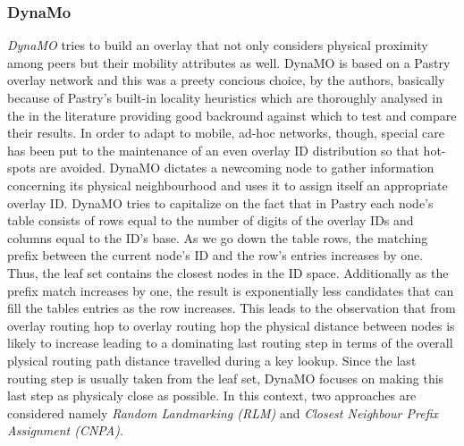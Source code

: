 %
%

\subsubsection{DynaMo}
\emph{DynaMO} \cite{winter_dynamo_2004} tries to build an overlay that not only 
considers physical proximity among peers but their mobility attributes as well.
DynaMO is based on a Pastry overlay network and this was a preety concious
choice, by the authors, basically because of Pastry's built-in locality
heuristics which are thoroughly analysed in the in the literature
\cite{castro_proximityp2p_2002} providing good backround against which to test
and compare their results. In order to adapt to mobile, ad-hoc networks,
though, special care has been put to the maintenance of an even overlay ID
distribution so that hot-spots are avoided. DynaMO dictates a newcoming node to
gather information concerning its physical neighbourhood and uses it to assign
itself an appropriate overlay ID. DynaMO tries to capitalize on the fact that
in Pastry each node's table consists of rows equal to the number of digits of
the overlay IDs and columns equal to the ID's base. As we go down the table
rows, the matching prefix between the current node's ID and the row's entries
increases by one. Thus, the leaf set contains the closest nodes in the ID space.
Additionally as the prefix match increases by one, the result is exponentially
less candidates that can fill the tables entries as the row increases. This
leads to the observation \cite{antony_pastry_2001,castro_proximityp2p_2002} that
from overlay routing hop to overlay routing hop the physical distance between
nodes is likely to increase leading to a dominating last routing step in terms
of the overall plysical routing path distance travelled during a key lookup.
Since the last routing step is usually taken from the leaf set, DynaMO focuses
on making this last step as physicaly close as possible. In this context, two
approaches are considered namely \emph{Random Landmarking (RLM)} and
\emph{Closest Neighbour Prefix Assignment (CNPA)}.

